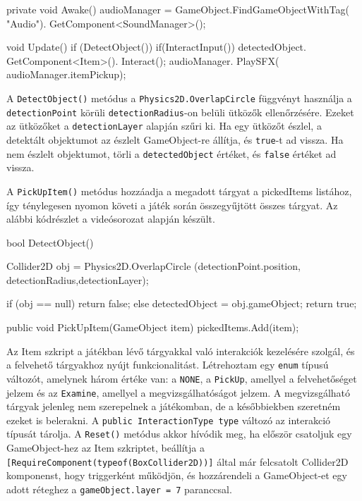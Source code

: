 \begin{java}
private void Awake()
{
    audioManager = 
        GameObject.FindGameObjectWithTag(
            "Audio").
            GetComponent<SoundManager>();
}

void Update()
{
    if (DetectObject())
    {
        if(InteractInput())
        {
            detectedObject.
                GetComponent<Item>().
                Interact();
            audioManager.
                PlaySFX(
                audioManager.itemPickup);
        }
    }
}
\end{java}

A \texttt{DetectObject()} metódus a \texttt{Physics2D.OverlapCircle} függvényt használja a \texttt{detectionPoint} körüli \texttt{detectionRadius}-on belüli ütközők ellenőrzésére. Ezeket az ütközőket a \texttt{detectionLayer} alapján szűri ki. Ha egy ütközőt észlel, a detektált objektumot az észlelt GameObject-re állítja, és \texttt{true}-t ad vissza. Ha nem észlelt objektumot, törli a \texttt{detectedObject} értéket, és \texttt{false} értéket ad vissza.

A \texttt{PickUpItem()} metódus hozzáadja a megadott tárgyat a pickedItems listához, így ténylegesen nyomon követi a játék során összegyűjtött összes tárgyat. Az alábbi kódrészlet a \cite{youtubeplaylist} videósorozat alapján készült.

\begin{java}
bool DetectObject()
{
    Collider2D obj = 
        Physics2D.OverlapCircle
        (detectionPoint.position,
        detectionRadius,detectionLayer);

    if (obj == null)
    {
        return false;
    }
    else
    {
        detectedObject = obj.gameObject;
        return true;
    }
   
}

public void PickUpItem(GameObject item)
{
    pickedItems.Add(item);
}
\end{java}

Az Item szkript a játékban lévő tárgyakkal való interakciók kezelésére szolgál, és a felvehető tárgyakhoz nyújt funkcionalitást. Létrehoztam egy \texttt{enum} típusú változót, amelynek három értéke van: a \texttt{NONE}, a \texttt{PickUp}, amellyel a felvehetőséget jelzem és az \texttt{Examine}, amellyel a megvizsgálhatóságot jelzem. A megvizsgálható tárgyak jelenleg nem szerepelnek a játékomban, de a későbbiekben szeretném ezeket is belerakni. A \texttt{public InteractionType type} változó az interakció típusát tárolja. A \texttt{Reset()} metódus akkor hívódik meg, ha először csatoljuk egy GameObject-hez az Item szkriptet, beállítja a \texttt{[RequireComponent(typeof(BoxCollider2D))]} által már felcsatolt Collider2D komponenst, hogy triggerként működjön, és hozzárendeli a GameObject-et egy adott réteghez a \texttt{gameObject.layer = 7} paranccsal.

